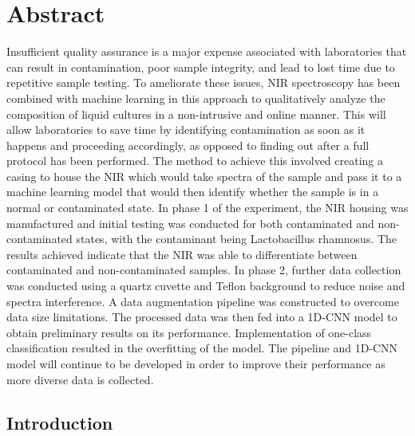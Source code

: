 \documentclass[12pt]{report}
\begin{document}
\chapter*{Abstract}
Insufficient quality assurance is a major expense associated with laboratories that can result in contamination, poor sample integrity, and lead to lost time due to repetitive sample testing. To ameliorate these issues, NIR spectroscopy has been combined with machine learning in this approach to qualitatively analyze the composition of liquid cultures in a non-intrusive and online manner. This will allow laboratories to save time by identifying contamination as soon as it happens and proceeding accordingly, as opposed to finding out after a full protocol has been performed. The method to achieve this involved creating a casing to house the NIR which would take spectra of the sample and pass it to a machine learning model that would then identify whether the sample is in a normal or contaminated state. In phase 1 of the experiment, the NIR housing was manufactured and initial testing was conducted for both contaminated and non-contaminated states, with the contaminant being Lactobacillus rhamnosus. The results achieved indicate that the NIR was able to differentiate between contaminated and non-contaminated samples. In phase 2, further data collection was conducted using a quartz cuvette and Teflon background to reduce noise and spectra interference. A data augmentation pipeline was constructed to overcome data size limitations. The processed data was then fed into a 1D-CNN model to obtain preliminary results on its performance. Implementation of one-class classification resulted in the overfitting of the model. The pipeline and 1D-CNN model will continue to be developed in order to improve their performance as more diverse data is collected.

\thispagestyle{empty}

\newpage
\tableofcontents
\thispagestyle{empty}
\newpage

\section{Introduction} %
\end{document}
